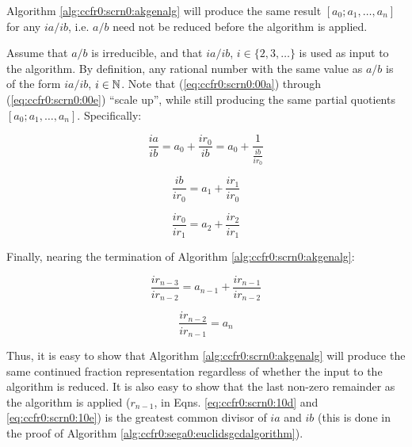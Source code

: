 \begin{vworklemmastatement}
\label{lem:ccfr0:scrn0:aoverbneednotbeirreducible}
Algorithm \ref{alg:ccfr0:scrn0:akgenalg} will 
produce the same result 
$[a_0; a_1, \ldots{} , a_n]$ for any
$ia/ib$, i.e. $a/b$ need not be reduced before the algorithm
is applied.
\end{vworklemmastatement}
\begin{vworklemmaproof}
Assume that $a/b$ is irreducible, and that $ia/ib$,
$i \in \{ 2, 3, \ldots \}$ is used as input to
the algorithm.  By definition, any rational number
with the same value as $a/b$ is of the form $ia/ib$, 
$i \in {\mathbb{N}}$.
Note that (\ref{eq:ccfr0:scrn0:00a}) through 
(\ref{eq:ccfr0:scrn0:00e}) ``scale up'', while still producing
the same partial quotients $[a_0; a_1, \ldots{} , a_n]$.
Specifically:

\begin{equation}
\label{eq:ccfr0:scrn0:10a}
\frac{ia}{ib}
=
a_0 + \frac{ir_0}{ib}
=
a_0 + \frac{1}{\frac{ib}{ir_0}}
\end{equation}

\begin{equation}
\label{eq:ccfr0:scrn0:10b}
\frac{ib}{ir_0}
=
a_1 + \frac{ir_1}{ir_0}
\end{equation}

\begin{equation}
\label{eq:ccfr0:scrn0:10c}
\frac{ir_0}{ir_1}
=
a_2 + \frac{ir_2}{ir_1}
\end{equation}

\noindent{}Finally, nearing the termination of 
Algorithm \ref{alg:ccfr0:scrn0:akgenalg}:

\begin{equation}
\label{eq:ccfr0:scrn0:10d}
\frac{ir_{n-3}}{ir_{n-2}}
=
a_{n-1} + \frac{ir_{n-1}}{ir_{n-2}}
\end{equation}

\begin{equation}
\label{eq:ccfr0:scrn0:10e}
\frac{ir_{n-2}}{ir_{n-1}}
=
a_n
\end{equation}

Thus, it is easy to show that Algorithm \ref{alg:ccfr0:scrn0:akgenalg}
will produce the same continued fraction representation regardless of whether
the input to the algorithm is reduced.  It is also easy to show that the
last non-zero remainder as the algorithm is applied ($r_{n-1}$, in
Eqns. \ref{eq:ccfr0:scrn0:10d} and \ref{eq:ccfr0:scrn0:10e})
is the greatest common divisor of $ia$ and $ib$ (this is done
in the proof of Algorithm \ref{alg:ccfr0:sega0:euclidsgcdalgorithm}).
\end{vworklemmaproof}

